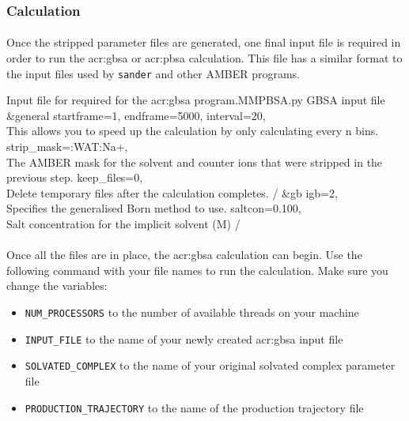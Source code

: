     \subsubsection{Calculation}
    \paragraph{}
    Once the stripped parameter files are generated, one final input file is required in order to run the \gls{acr:gbsa} or \gls{acr:pbsa} calculation. This file has a similar format to the input files used by \texttt{sander} and other AMBER programs.

    \begin{inpfile}[label=file:pbsa]{Input file for required for the \gls{acr:gbsa} program.}{MMPBSA.py}
GBSA input file
&general
    startframe=1, endframe=5000, interval=20, \\ This allows you to speed up the calculation by only calculating every n bins.
    strip_mask=:WAT:Na+, \\ The AMBER mask for the solvent and counter ions that were stripped in the previous step.
    keep_files=0, \\ Delete temporary files after the calculation completes.
/
&gb
    igb=2, \\ Specifies the generalised Born method to use.
    saltcon=0.100, \\ Salt concentration for the implicit solvent (M)
/
    \end{inpfile}

    \paragraph{}
    Once all the files are in place, the \gls{acr:gbsa} calculation can begin. Use the following command with your file names to run the calculation. Make sure you change the variables: 
    \begin{itemize}
        \item \texttt{NUM\_PROCESSORS} to the number of available threads on your machine
        \item \texttt{INPUT\_FILE} to the name of your newly created \gls{acr:gbsa} input file
        \item \texttt{SOLVATED\_COMPLEX} to the name of your original solvated complex parameter file
        \item \texttt{PRODUCTION\_TRAJECTORY} to the name of the production trajectory file
    \end{itemize}

